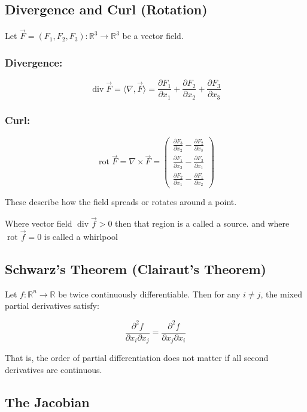 \subsection{Divergence and Curl (Rotation)}

Let \( \vec{F} = (F_1, F_2, F_3) : \mathbb{R}^3 \to \mathbb{R}^3 \) be a vector field.

\subsubsection{Divergence:}
\[
\operatorname{div} \vec{F} = \langle\nabla, \vec{F}\rangle = \frac{\partial F_1}{\partial x_1} + \frac{\partial F_2}{\partial x_2} + \frac{\partial F_3}{\partial x_3}
\]

\subsubsection{Curl:}
\[
\operatorname{rot} \vec{F} = \nabla \times \vec{F} = \begin{pmatrix}
\frac{\partial F_3}{\partial x_2} - \frac{\partial F_2}{\partial x_3} \\
\frac{\partial F_1}{\partial x_3} - \frac{\partial F_3}{\partial x_1} \\
\frac{\partial F_2}{\partial x_1} - \frac{\partial F_1}{\partial x_2}
\end{pmatrix}
\]

These describe how the field spreads or rotates around a point.

Where vector field \( \operatorname{div}\vec{f} > 0\) then that region is a called a source.
and where \(\operatorname{rot}\vec{f} = 0\) is called a whirlpool

\subsection{Schwarz’s Theorem (Clairaut’s Theorem)}

Let \( f : \mathbb{R}^n \to \mathbb{R} \) be twice continuously differentiable. Then for any \( i \ne j \), the mixed partial derivatives satisfy:

\[
\frac{\partial^2 f}{\partial x_i \partial x_j} = \frac{\partial^2 f}{\partial x_j \partial x_i}
\]

That is, the order of partial differentiation does not matter if all second derivatives are continuous.

\subsection{The Jacobian}

